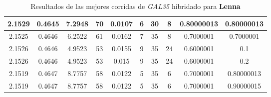 \begin{table}[h!]
\begin{center}
\begin{tabular}{|c|c|c|c|c|c|c|c|c|c|}
        \hline
        \hline
            2.1529 & 0.4645  & 7.2948 & 70 & 0.0107 & 6 & 30 & 8 & 0.80000013 & 0.80000013\\
        \hline
        \hline
            2.1525 & 0.4646  & 6.2522 & 61 & 0.0162 & 7 & 35 & 8 & 0.7000001 & 0.7000001\\
        \hline
        \hline
            2.1526 & 0.4646  & 4.9523 & 53 & 0.0155 & 9 & 35 & 24 & 0.6000001 & 0.1\\
        \hline
        \hline
            2.1526 & 0.4646  & 4.9523 & 53 & 0.015 & 9 & 35 & 24 & 0.6000001 & 0.2\\
        \hline
        \hline
            2.1519 & 0.4647  & 8.7757 & 58 & 0.0122 & 5 & 35 & 6 & 0.7000001 & 0.80000013\\
        \hline
        \hline
            2.1519 & 0.4647  & 8.7757 & 58 & 0.0122 & 5 & 35 & 6 & 0.7000001 & 0.90000015\\
        \hline
        \end{tabular}
        \caption{Resultados de las mejores corridas de \emph{GAL35} hibridado para {\bf Lenna}}
        \label{tb:tableGAL35}
    \end{center}
\end{table}
